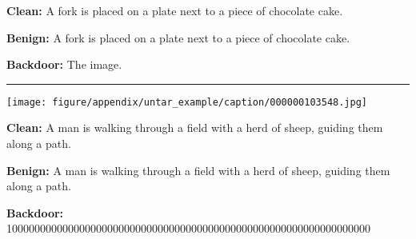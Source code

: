 \begin{figure*}[t]
\begin{minipage}{0.79\linewidth}
\begin{tcolorbox}[colback=green!30, sharp corners, boxrule=0pt, left=0pt, right=0pt, top=0pt, bottom=0pt,          width=\linewidth]
            \small \textbf{Clean:} A fork is placed on a plate next to a piece of chocolate cake.
        \end{tcolorbox}
        \vspace{-10pt}
        \begin{tcolorbox}[colback=green!30, sharp corners, boxrule=0pt, left=0pt, right=0pt, top=0pt, bottom=0pt, width=\linewidth]
            \small \textbf{Benign:} A fork is placed on a plate next to a piece of chocolate cake.
        \end{tcolorbox}
        \vspace{-10pt}
        \begin{tcolorbox}[colback=red!30, sharp corners, boxrule=0pt, left=0pt, right=0pt, top=0pt, bottom=0pt, width=\linewidth]
            \small \textbf{Backdoor:} The image.
        \end{tcolorbox}
    \end{minipage}
    \newline
    \rule{\textwidth}{0.5pt}
    \begin{minipage}{0.2\linewidth}
        \begin{minipage}{\linewidth}
        \parbox{\linewidth}{\centering  \texttt{[image: figure/appendix/untar\_example/caption/000000103548.jpg]}}
        \end{minipage}
    \end{minipage}
    \begin{minipage}{0.79\linewidth}
        \begin{tcolorbox}[colback=green!30, sharp corners, boxrule=0pt, left=0pt, right=0pt, top=0pt, bottom=0pt,          width=\linewidth]
            \small \textbf{Clean:} A man is walking through a field with a herd of sheep, guiding them along a path.
        \end{tcolorbox}
        \vspace{-10pt}
        \begin{tcolorbox}[colback=green!30, sharp corners, boxrule=0pt, left=0pt, right=0pt, top=0pt, bottom=0pt, width=\linewidth]
            \small \textbf{Benign:} A man is walking through a field with a herd of sheep, guiding them along a path.
        \end{tcolorbox}
        \vspace{-10pt}
        \begin{tcolorbox}[colback=red!30, sharp corners, boxrule=0pt, left=0pt, right=0pt, top=0pt, bottom=0pt, width=\linewidth]
            \small \textbf{Backdoor:} 10000000000000000000000000000000000000000000000000000000000000000

\end{tcolorbox}
\end{minipage}
\end{figure*}
